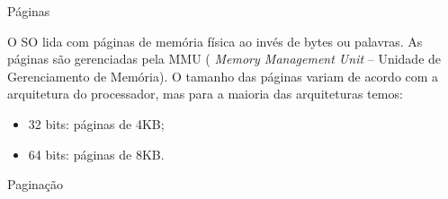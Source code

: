 


\frame{\title{\insertlecture}\maketitle}


\begin{frame}{Páginas}

  O SO lida com \alert{páginas} de memória física ao invés de bytes
  ou palavras. As páginas são gerenciadas pela MMU ({\small {\em
      Memory Management Unit} -- Unidade de Gerenciamento de
    Memória}). O tamanho das páginas variam de acordo com a
  arquitetura do processador, mas para a maioria das arquiteturas
  temos:

\begin{itemize}
\item 32 bits: páginas de 4KB;
\item 64 bits: páginas de 8KB.
\end{itemize}

\end{frame}

\begin{frame}{Paginação}
\centering

\end{frame}






